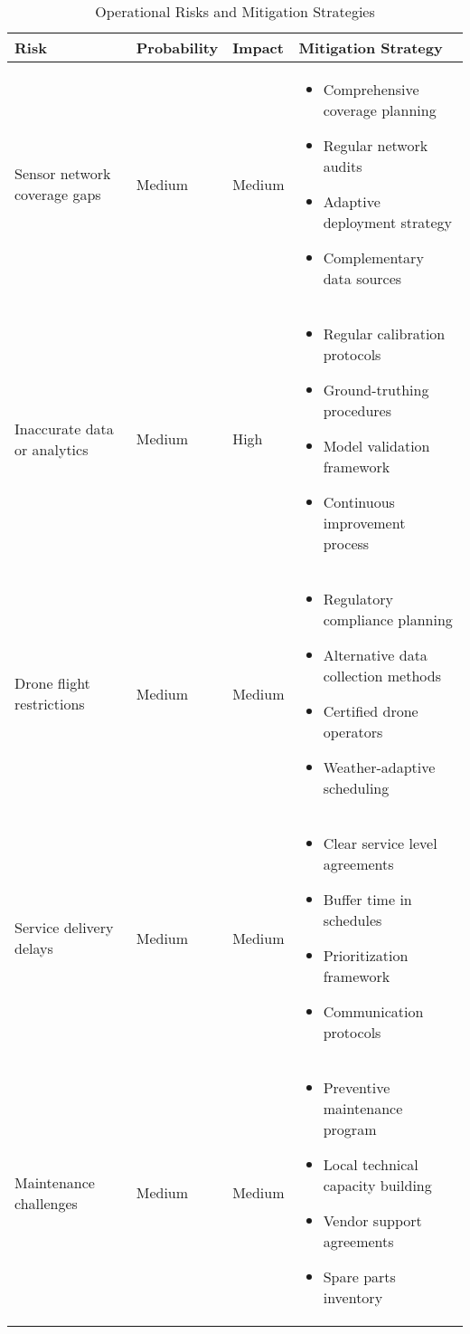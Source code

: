 \begin{table}[H]
\centering
\begin{tabular}{|p{3cm}|p{2cm}|p{2cm}|p{7cm}|}
\hline
\textbf{Risk} & \textbf{Probability} & \textbf{Impact} & \textbf{Mitigation Strategy} \\
\hline
Sensor network coverage gaps & Medium & Medium & 
\begin{itemize}
    \item Comprehensive coverage planning
    \item Regular network audits
    \item Adaptive deployment strategy
    \item Complementary data sources
\end{itemize} \\
\hline
Inaccurate data or analytics & Medium & High & 
\begin{itemize}
    \item Regular calibration protocols
    \item Ground-truthing procedures
    \item Model validation framework
    \item Continuous improvement process
\end{itemize} \\
\hline
Drone flight restrictions & Medium & Medium & 
\begin{itemize}
    \item Regulatory compliance planning
    \item Alternative data collection methods
    \item Certified drone operators
    \item Weather-adaptive scheduling
\end{itemize} \\
\hline
Service delivery delays & Medium & Medium & 
\begin{itemize}
    \item Clear service level agreements
    \item Buffer time in schedules
    \item Prioritization framework
    \item Communication protocols
\end{itemize} \\
\hline
Maintenance challenges & Medium & Medium & 
\begin{itemize}
    \item Preventive maintenance program
    \item Local technical capacity building
    \item Vendor support agreements
    \item Spare parts inventory
\end{itemize} \\
\hline
\end{tabular}
\caption{Operational Risks and Mitigation Strategies}
\end{table}

